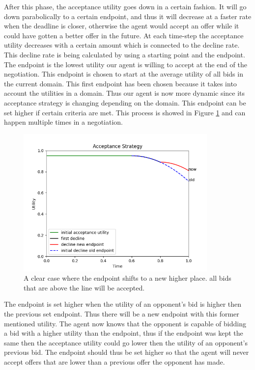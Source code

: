 \documentclass{article}
\begin{document}
\begin{enumerate}
\begin{itemize}
After this phase, the acceptance utility goes down in a certain fashion. It will go down parabolically to a certain endpoint, and thus it will decrease at a faster rate when the deadline is closer, otherwise the agent would accept an offer while it could have gotten a better offer in the future. At each time-step the acceptance utility decreases with a certain amount which is connected to the decline rate. This decline rate is being calculated by using a starting point and the endpoint. The endpoint is the lowest utility our agent is willing to accept at the end of the negotiation. This endpoint is chosen to start at the average utility of all bids in the current domain. This first endpoint has been chosen because it takes into account the utilities in a domain. Thus our agent is now more dynamic since its acceptance strategy is changing depending on the domain. This endpoint can be set higher if certain criteria are met. This process is showed in Figure \ref{fig:acceptance} and can happen multiple times in a negotiation.

\begin{figure}[h!]
    \centering
    \includegraphics[width=280pt]{acceptance_strat.png}
    \caption{A clear case where the endpoint shifts to a new higher place. all bids that are above the line will be accepted. }
    \label{fig:acceptance}
\end{figure}

The endpoint is set higher when the utility of an opponent's bid is higher then the previous set endpoint. Thus there will be a new endpoint with this former mentioned utility. The agent now knows that the opponent is capable of bidding a bid with a higher utility than the endpoint, thus if the endpoint was kept the same then the acceptance utility could go lower then the utility of an opponent's previous bid. The endpoint should thus be set higher so that the agent will never accept offers that are lower than a previous offer the opponent has made.


\end{itemize}
\end{enumerate}
\end{document}
